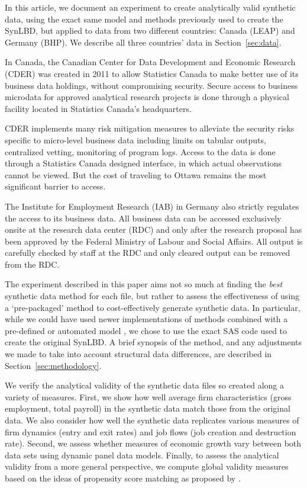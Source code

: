 \documentclass[10pt,twoside]{article}
\begin{document}
In this article, we document an experiment to create analytically valid synthetic data, using the exact same model and methods previously used to create the \ac{SynLBD}, but applied to data from two different countries: Canada (\ac{LEAP}) and Germany (\ac{BHP}). We describe all three countries' data in Section~\ref{sec:data}. 


In Canada, the Canadian Center for Data Development and Economic Research (CDER) was created in 2011 to allow Statistics Canada to make better use of its business data holdings, without compromising security. Secure access  to business microdata for approved analytical research projects is done through a physical facility located in Statistics Canada’s headquarters. 

CDER implements many risk mitigation measures to alleviate the security risks specific to micro-level business data including limits on tabular outputs, centralized vetting, monitoring of program logs. Access to the data is done through a Statistics Canada designed interface, in which actual observations cannot be viewed. But the cost of traveling to Ottawa remains the most significant barrier to access.

The Institute for Employment Research (IAB) in Germany also strictly regulates the access to its business data. All business data can  be accessed exclusively onsite at the research data center (RDC) and only after the research proposal has been approved by the Federal Ministry of Labour and Social Affairs. All output is carefully checked by staff at the RDC and only cleared output can be removed  from the RDC. 

The experiment described in this paper aims not so much at finding the \textit{best} synthetic data method for each file, but rather to assess the effectiveness of using a `pre-packaged' method to cost-effectively generate synthetic data. In particular, while we could have used newer implementations of methods combined with a pre-defined or automated model \citep{JSSv074i11,Raab_Nowok_Dibben_2018}, we chose to use the exact SAS code used to create the original \ac{SynLBD}. A brief synopsis of the  method, and any adjustments we made to take into account structural data differences, are described in Section~\ref{sec:methodology}.

We verify the analytical validity of the synthetic data files so created along a variety of measures. First, we show how well average firm characteristics (gross employment, total payroll) in the synthetic data  match those from the original data. We also consider how well the synthetic data  replicates various measures of firm dynamics (entry and exit rates) and job flows (job creation and destruction rate). Second, we assess whether measures of economic growth vary between both data sets using dynamic panel data models. Finally, to assess the analytical validity from a more general perspective, we  compute global validity measures based on the ideas of propensity score matching as proposed by \citet{Woo_Reiter_Oganian_Karr_2009,Snoke_RSSA2018}.
\end{document}
